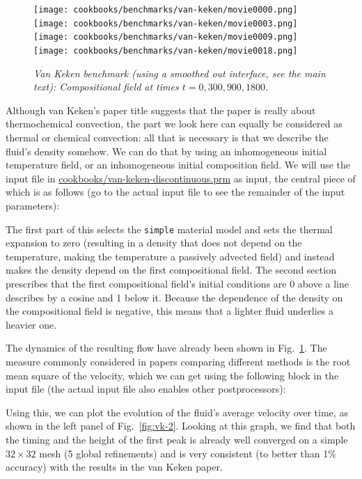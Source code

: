 \documentclass{article}
\begin{document}
\begin{figure}
  \texttt{[image: cookbooks/benchmarks/van-keken/movie0000.png]}
  \hfill
  \texttt{[image: cookbooks/benchmarks/van-keken/movie0003.png]}
  \hfill
  \texttt{[image: cookbooks/benchmarks/van-keken/movie0009.png]}
  \hfill
  \texttt{[image: cookbooks/benchmarks/van-keken/movie0018.png]}
  \caption{\it Van Keken benchmark (using a smoothed out interface, see the main
  text):
  Compositional field at times $t=0, 300, 900, 1800$.}
  \label{fig:vk-1}
\end{figure}


Although van Keken's paper title suggests that the paper is really about
thermochemical convection, the part we look here can equally be considered as
thermal or chemical convection: all that is necessary is that we describe the
fluid's density somehow. We can do that by using an inhomogeneous initial
temperature field, or an inhomogeneous initial composition field. We will use the
input file in \url{cookbooks/van-keken-discontinuous.prm} as input, the central
piece of which is as follows (go to the actual input file
to see the remainder of the input parameters):



The first part of this selects the \texttt{simple} material model and sets the
thermal expansion to zero (resulting in a density that does not depend on the
temperature, making the temperature a passively advected field) and instead
makes the density depend on the first compositional field. The second section
prescribes that the first compositional field's
initial conditions are 0 above a line describes by a cosine and 1 below it.
Because the dependence of the density on the compositional field is negative,
this means that a lighter fluid underlies a heavier one.

The dynamics of the resulting flow have already been shown in
Fig.~\ref{fig:vk-1}. The measure commonly considered in papers comparing
different methods is the root mean square of the velocity, which we can get
using the following block in the input file (the actual input file also enables
other postprocessors):



Using this, we can plot the evolution of the fluid's average velocity over time,
as shown in the left panel of Fig.~\ref{fig:vk-2}. Looking at this graph, we
find that both the timing and the height of the first peak is already
well converged on a simple
$32\times 32$ mesh (5 global refinements) and is very consistent (to better
than 1\% accuracy) with the results in the van Keken paper.
\end{document}
